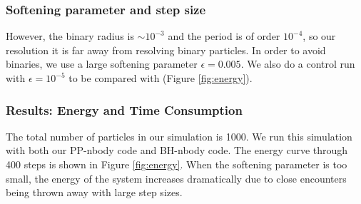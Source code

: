 \subsubsection*{Softening parameter and step size}
However, the binary radius is $ \sim 10^{-3} $ and the period is of order $ 10^{-4} $, so our 
resolution it is far away from resolving binary particles. In order to avoid binaries, we use 
a large softening parameter $ \epsilon = 0.005 $. We also do a control run with $ \epsilon 
= 10^{-5} $ to be compared with (Figure \ref{fig:energy}).

\subsubsection*{Results: Energy and Time Consumption}
The total number of particles in our simulation is 1000. We run this simulation with both 
our PP-nbody code and BH-nbody code. The energy curve through 400 steps is shown in 
Figure \ref{fig:energy}. When the softening parameter is too small, the energy of the 
system increases dramatically due to close encounters being thrown away with large step 
sizes. 


